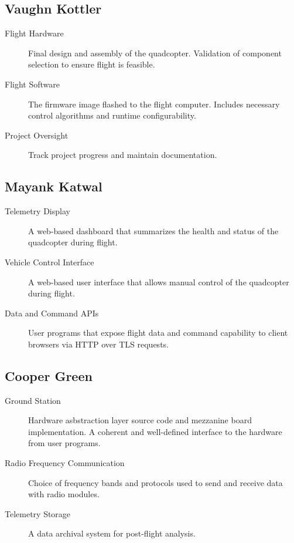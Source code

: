 \documentclass{article}
\begin{document}
\subsection{Vaughn Kottler}

\begin{description}
	\item [Flight Hardware] Final design and assembly of the quadcopter.
		Validation of component selection to ensure flight is feasible.
	\item [Flight Software] The firmware image flashed to the flight
		computer. Includes necessary control algorithms and runtime
		configurability.
	\item [Project Oversight] Track project progress and maintain
		documentation.
\end{description}

\subsection{Mayank Katwal}

\begin{description}
	\item [Telemetry Display] A web-based dashboard that summarizes the health
		and status of the quadcopter during flight.
	\item [Vehicle Control Interface] A web-based user interface that allows
		manual control of the quadcopter during flight.
	\item [Data and Command APIs] User programs that expose flight data
		and command capability to client browsers via HTTP over TLS requests.
\end{description}

\subsection{Cooper Green}

\begin{description}
	\item [Ground Station] Hardware asbstraction layer source code and
		mezzanine board implementation. A coherent and well-defined interface
		to the hardware from user programs.
	\item [Radio Frequency Communication] Choice of frequency bands and
		protocols used to send and receive data with radio modules.
	\item [Telemetry Storage] A data archival system for post-flight analysis.
\end{description}
\end{document}
